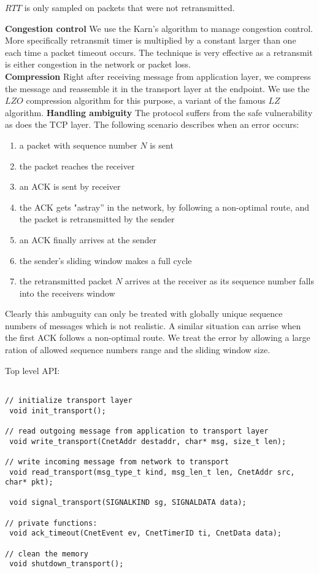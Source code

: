 \documentclass[11pt,a4paper,oneside]{report}
\begin{document}
$RTT$ is only sampled on packets that were not retransmitted.

\noindent \textbf{Congestion control}
We use the Karn's algorithm to manage congestion control. More specifically
retransmit timer is multiplied by a constant larger than one each time a packet
timeout occurs. The technique is very effective as a retransmit is either
congestion in the network or packet loss. \\
\noindent \textbf{Compression}
Right after receiving message from application layer, we compress the message
and reassemble it in the transport layer at the endpoint. We use the $LZO$
compression algorithm for this purpose, a variant of the famous $LZ$ algorithm.
\noindent \textbf{Handling ambiguity}
The protocol suffers from the safe vulnerability as does the TCP layer.
The following scenario describes when an error occurs:
\begin{enumerate}
\item a packet with sequence number $N$ is sent
\item the packet reaches the receiver
\item an ACK is sent by receiver
\item the ACK gets "astray'' in the network, by following a non-optimal route, and the packet is retransmitted by the sender
\item an ACK finally arrives at the sender
\item the sender's sliding window makes a full cycle
\item the retransmitted packet $N$ arrives at the receiver as its sequence number falls into the receivers window
\end{enumerate}

Clearly this ambuguity can only be treated with globally unique sequence numbers of messages which is not realistic.
A similar situation can arrise when the first ACK follows a non-optimal route. We treat the error by allowing
a large ration of allowed sequence numbers range and the sliding window size.

    \newpage
    Top level API:
 \begin{lstlisting}

// initialize transport layer
 void init_transport();

// read outgoing message from application to transport layer
 void write_transport(CnetAddr destaddr, char* msg, size_t len);

// write incoming message from network to transport
 void read_transport(msg_type_t kind, msg_len_t len, CnetAddr src, char* pkt);

 void signal_transport(SIGNALKIND sg, SIGNALDATA data);

// private functions:
 void ack_timeout(CnetEvent ev, CnetTimerID ti, CnetData data);

// clean the memory
 void shutdown_transport();
  \end{lstlisting}
\end{document}
